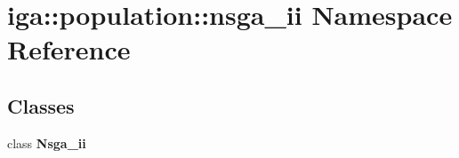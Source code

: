 \section{iga::population::nsga\_\-ii Namespace Reference}
\label{namespaceiga_1_1population_1_1nsga__ii}


\subsection*{Classes}
\begin{CompactItemize}
\item 
class {\bf Nsga\_\-ii}
\end{CompactItemize}

